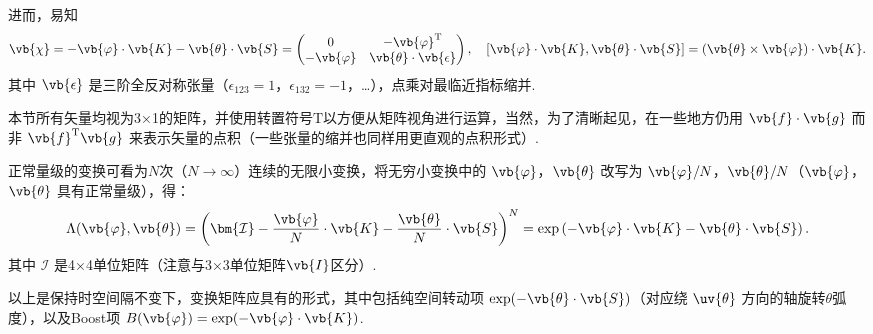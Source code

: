 进而，易知
\begin{equation*}
	\vb{\chi} = -\vb{\varphi} \cdot \vb{K} - \vb{\theta} \cdot \vb{S} = \begin{pmatrix}
		0             & -\vb{\varphi}^\mathrm{T}        \\
		-\vb{\varphi} & \vb{\theta} \cdot \vb{\epsilon}
	\end{pmatrix}, \quad
	[\vb{\varphi} \cdot \vb{K}, \vb{\theta} \cdot \vb{S}] = (\vb{\theta} \times \vb{\varphi}) \cdot \vb{K}.
\end{equation*}
其中 \(\vb{\epsilon}\) 是三阶全反对称张量（\(\epsilon_{123} = 1\)，\(\epsilon_{132} = -1\)，…），点乘对最临近指标缩并.
\begin{notes}
	本节所有矢量均视为3×1的矩阵，并使用转置符号\(\mathrm{T}\)以方便从矩阵视角进行运算，当然，为了清晰起见，在一些地方仍用 \(\vb{f} \cdot \vb{g}\) 而非 \(\vb{f}^\mathrm{T} \vb{g}\) 来表示矢量的点积（一些张量的缩并也同样用更直观的点积形式）.
\end{notes}

正常量级的变换可看为\(N\)次（\(N \to \infty\)）连续的无限小变换，将无穷小变换中的 \(\vb{\varphi}\)，\(\vb{\theta}\) 改写为 \(\vb{\varphi}/N\)，\(\vb{\theta}/N\)（\(\vb{\varphi}\)，\(\vb{\theta}\) 具有正常量级），得：
\begin{equation*}
	\Lambda(\vb{\varphi}, \vb{\theta}) = \left( \bm{\mathcal{I}} - \dfrac{\vb{\varphi}}{N} \cdot \vb{K} - \dfrac{\vb{\theta}}{N} \cdot \vb{S} \right)^N = \exp\left( -\vb{\varphi} \cdot \vb{K} - \vb{\theta} \cdot \vb{S} \right).
\end{equation*}
其中 \(\bm{\mathcal{I}}\) 是4×4单位矩阵（注意与3×3单位矩阵\(\vb{I}\)区分）.

以上是保持时空间隔不变下，变换矩阵应具有的形式，其中包括纯空间转动项 \(\exp(-\vb{\theta} \cdot \vb{S})\)（对应绕 \(\uv{\theta}\) 方向的轴旋转\(\theta\)弧度），以及Boost项 \(B(\vb{\varphi}) = \exp(-\vb{\varphi} \cdot \vb{K})\).

